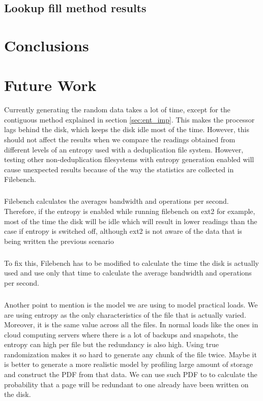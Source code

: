 \section{Lookup fill method results}


\chapter{Conclusions}\label{chap:conc}
\chapter{Future Work}\label{chap:fut}


Currently generating the random data takes a lot of time, except for the contiguous method explained in section \ref{sec:ent_imp}.
This makes the processor lags behind the disk, which keeps the disk idle most of the time.
 However, this should not affect the results when we compare the readings obtained from different levels of an entropy used with a deduplication file system.
 However, testing other non-deduplication filesystems with entropy generation enabled will cause unexpected results because of the way the statistics are collected in Filebench.
\paragraph{}
 Filebench calculates the averages bandwidth and operations per second.
 Therefore, if the entropy is enabled while running filebench on ext2 for example, most of the time the disk will be idle which will result in lower readings than the case if entropy is switched off, although ext2 is not aware of the data that is being written the previous scenario 
\paragraph{}
To fix this, Filebench has to be modified to calculate the time the disk is actually used and use only that time to calculate the average bandwidth and operations per second.
\paragraph{}
Another point to mention is the model we are using to model practical loads. We are using entropy as the only characteristics of the file that is actually varied.
 Moreover, it is the same value across all the files. In normal loads like the ones in cloud computing servers where there is a lot of backups and snapshots, the entropy can high per file but the redundancy is also high.
 Using true randomization makes it so hard to generate any chunk of the file twice.
 Maybe it is better to generate a more realistic model by profiling large amount of storage and construct the PDF from that data. We can use such PDF to to calculate the probability that a page will be redundant to one already have been written on the disk.
